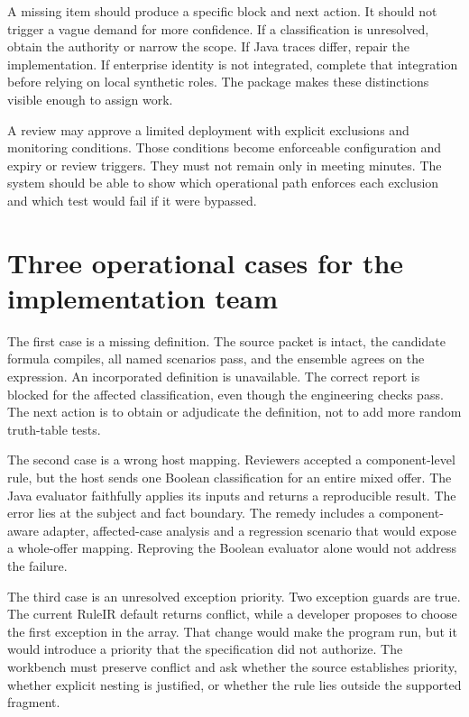 \documentclass[12pt,a4paper,oneside,openany]{book}
\begin{document}
A missing item should produce a specific block and next action. It should not
trigger a vague demand for more confidence. If a classification is unresolved,
obtain the authority or narrow the scope. If Java traces differ, repair the
implementation. If enterprise identity is not integrated, complete that integration
before relying on local synthetic roles. The package makes these distinctions
visible enough to assign work.

A review may approve a limited deployment with explicit exclusions and monitoring
conditions. Those conditions become enforceable configuration and expiry or
review triggers. They must not remain only in meeting minutes. The system should
be able to show which operational path enforces each exclusion and which test
would fail if it were bypassed.

\section{Three operational cases for the implementation team}

The first case is a missing definition. The source packet is intact, the candidate
formula compiles, all named scenarios pass, and the ensemble agrees on the
expression. An incorporated definition is unavailable. The correct report is
blocked for the affected classification, even though the engineering checks pass.
The next action is to obtain or adjudicate the definition, not to add more random
truth-table tests.

The second case is a wrong host mapping. Reviewers accepted a component-level
rule, but the host sends one Boolean classification for an entire mixed offer.
The Java evaluator faithfully applies its inputs and returns a reproducible
result. The error lies at the subject and fact boundary. The remedy includes a
component-aware adapter, affected-case analysis and a regression scenario that
would expose a whole-offer mapping. Reproving the Boolean evaluator alone would
not address the failure.

The third case is an unresolved exception priority. Two exception guards are
true. The current RuleIR default returns conflict, while a developer proposes to
choose the first exception in the array. That change would make the program run,
but it would introduce a priority that the specification did not authorize. The
workbench must preserve conflict and ask whether the source establishes priority,
whether explicit nesting is justified, or whether the rule lies outside the
supported fragment.
\end{document}
